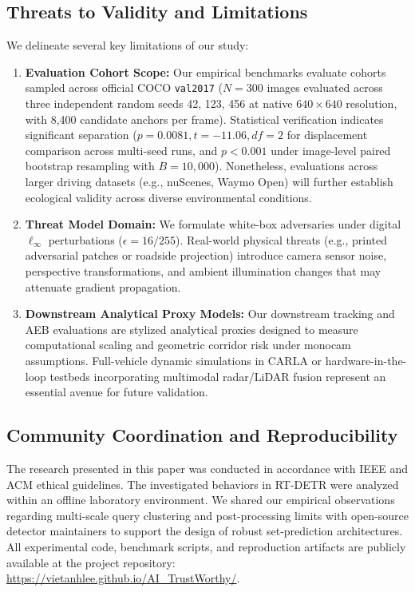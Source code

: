 \documentclass[preprint,12pt]{elsarticle}
\begin{document}
\subsection{Threats to Validity and Limitations}
We delineate several key limitations of our study:
\begin{enumerate}
    \item \textbf{Evaluation Cohort Scope:} Our empirical benchmarks evaluate cohorts sampled across official COCO \texttt{val2017} ($N=300$ images evaluated across three independent random seeds 42, 123, 456 at native $640\times 640$ resolution, with 8,400 candidate anchors per frame). Statistical verification indicates significant separation ($p = 0.0081, t = -11.06, df = 2$ for displacement comparison across multi-seed runs, and $p < 0.001$ under image-level paired bootstrap resampling with $B=10{,}000$). Nonetheless, evaluations across larger driving datasets (e.g., nuScenes, Waymo Open) will further establish ecological validity across diverse environmental conditions.
    \item \textbf{Threat Model Domain:} We formulate white-box adversaries under digital $\ell_\infty$ perturbations ($\epsilon = 16/255$). Real-world physical threats (e.g., printed adversarial patches or roadside projection) introduce camera sensor noise, perspective transformations, and ambient illumination changes that may attenuate gradient propagation.
    \item \textbf{Downstream Analytical Proxy Models:} Our downstream tracking and AEB evaluations are stylized analytical proxies designed to measure computational scaling and geometric corridor risk under monocam assumptions. Full-vehicle dynamic simulations in CARLA or hardware-in-the-loop testbeds incorporating multimodal radar/LiDAR fusion represent an essential avenue for future validation.
\end{enumerate}

\subsection{Community Coordination and Reproducibility}
The research presented in this paper was conducted in accordance with IEEE and ACM ethical guidelines. The investigated behaviors in RT-DETR were analyzed within an offline laboratory environment. We shared our empirical observations regarding multi-scale query clustering and post-processing limits with open-source detector maintainers to support the design of robust set-prediction architectures. All experimental code, benchmark scripts, and reproduction artifacts are publicly available at the project repository: \url{https://vietanhlee.github.io/AI_TrustWorthy/}.
\end{document}
